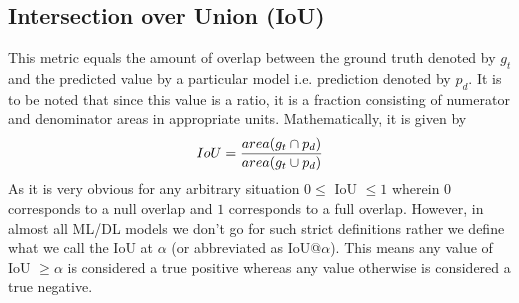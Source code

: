 \subsection{Intersection over Union (IoU)}
This metric equals the amount of overlap between the ground truth denoted by $g_t$ and the predicted value by a particular model i.e. prediction denoted by $p_d$. It is to be noted that since this value is a ratio, it is a fraction consisting of numerator and denominator areas in appropriate units. Mathematically, it is given by
\begin{equation}
  \centering
  IoU = \frac{area({g_{t}}\cap{ p_{d }})}{area({g_{t}}\cup{ p_{d }})}
\end{equation}
As it is very obvious for any arbitrary situation $0 \leqslant $ IoU $\leqslant 1$ wherein $0$ corresponds to a null overlap and $1$ corresponds to a full overlap. However, in almost all ML/DL models we don’t go for such strict definitions rather we define what we call the IoU at $\alpha$ (or abbreviated as IoU@$\alpha$). This means any value of IoU $\geqslant \alpha$ is considered a true positive whereas any value otherwise is considered a true negative. \par

